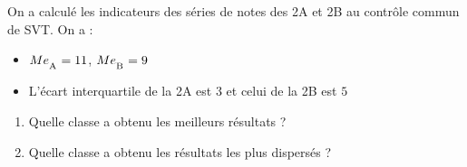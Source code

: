 \begin{exo}
	On a calculé les indicateurs des séries de notes des 2A et 2B au contrôle commun de SVT. On a :
	\begin{itemize}
		\item $Me_{\textsubscript{A}} = 11$, $Me_{\textsubscript{B}} = 9$
		\item L'écart interquartile de la 2A est $3$ et celui de la 2B est $5$
	\end{itemize}

	\begin{enumerate}
		\item Quelle classe a obtenu les meilleurs résultats ?
		\item Quelle classe a obtenu les résultats les plus dispersés ?
	\end{enumerate}
\end{exo}

